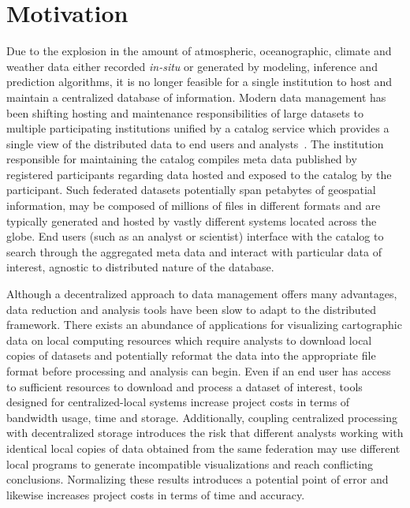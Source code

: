 \section{Motivation}
\label{sec:motivation}
Due to the explosion in the amount of atmospheric, oceanographic,
climate and weather data either recorded \emph{in-situ} or generated
by modeling, inference and prediction algorithms, it is no longer
feasible for a single institution to host and maintain a centralized
database of information. Modern data management has been shifting
hosting and maintenance responsibilities of large datasets to multiple
participating institutions unified by a catalog service which provides
a single view of the distributed data to end users and
analysts~\cite{luettich13, williams09, chervenak00}. The institution
responsible for maintaining the catalog compiles meta data published
by registered participants regarding data hosted and exposed to the
catalog by the participant. Such federated datasets potentially span
petabytes of geospatial information, may be composed of millions of
files in different formats and are typically generated and hosted by
vastly different systems located across the globe. End users (such as
an analyst or scientist) interface with the catalog to search through
the aggregated meta data and interact with particular data of
interest, agnostic to distributed nature of the database.

Although a decentralized approach to data management offers many
advantages, data reduction and analysis tools have been slow to adapt
to the distributed framework. There exists an abundance of
applications for visualizing cartographic data on local computing
resources which require analysts to download local copies of datasets
and potentially reformat the data into the appropriate file format
before processing and analysis can begin. Even if an end user has
access to sufficient resources to download and process a dataset of
interest, tools designed for centralized-local systems increase
project costs in terms of bandwidth usage, time and
storage. Additionally, coupling centralized processing with
decentralized storage introduces the risk that different analysts
working with identical local copies of data obtained from the same
federation may use different local programs to generate incompatible
visualizations and reach conflicting conclusions. Normalizing these
results introduces a potential point of error and likewise increases
project costs in terms of time and accuracy.

